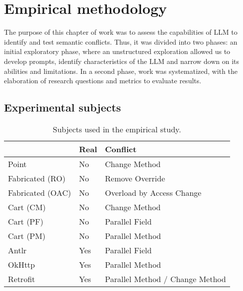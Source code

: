 \chapter{Empirical methodology}\label{chap:study}

The purpose of this chapter of work was to assess the capabilities of LLM to identify and test semantic conflicts.
Thus, it was divided into two phases: an initial exploratory phase, where an unstructured exploration allowed us to develop prompts, identify characteristics of the LLM and narrow down on its abilities and limitations.
In a second phase, work was systematized, with the elaboration of research questions and metrics to evaluate results.

\section{Experimental subjects}\label{chap:study:subjects}

\begin{table}[t]
\centering
\begin{tabular}{@{\extracolsep{\fill}} lll} \toprule
                 & Real & Conflict \\
\midrule
Point            & No  & Change Method \\
Fabricated (RO)  & No  & Remove Override \\
Fabricated (OAC) & No  & Overload by Access Change \\
Cart (CM)        & No  & Change Method \\
Cart (PF)        & No  & Parallel Field \\
Cart (PM)        & No  & Parallel Method \\
Antlr            & Yes & Parallel Field \\
OkHttp           & Yes & Parallel Method \\
Retrofit         & Yes & Parallel Method / Change Method \\
\bottomrule
\end{tabular}
\caption{Subjects used in the empirical study.\label{tab:subjects}}
\end{table}

